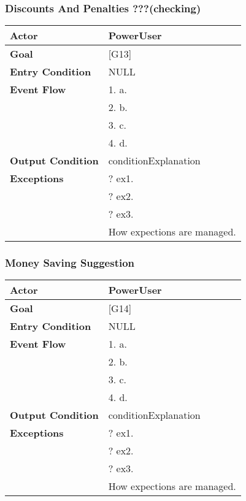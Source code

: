 \subsubsection{Discounts And Penalties ???(checking)}
\begin{tabular}{| l | p{8cm} |}
\hline
\textbf{Actor}      &       PowerUser \\
\hline
\textbf{Goal}       &       [G13]\\
\hline
\textbf{Entry Condition} &  NULL\\
\hline
\textbf{Event Flow}     &   1.	a.\\&
                                            2.	b.\\&
                                            3.	c.\\&
                                            4.  d.\\
\hline
\textbf{Output Condition} & conditionExplanation\\
\hline
\textbf{Exceptions} &       ?   ex1.\\& 
                            ?	ex2.\\&
                            ?	ex3.\\& 
                           How expections are managed.\\
\hline
\end{tabular} 


\subsubsection{Money Saving Suggestion}
\begin{tabular}{| l | p{8cm} |}
\hline
\textbf{Actor}      &       PowerUser \\
\hline
\textbf{Goal}       &       [G14]\\
\hline
\textbf{Entry Condition} &  NULL\\
\hline
\textbf{Event Flow}     &   1.	a.\\&
                                            2.	b.\\&
                                            3.	c.\\&
                                            4.  d.\\
\hline
\textbf{Output Condition} & conditionExplanation\\
\hline
\textbf{Exceptions} &       ?   ex1.\\& 
                            ?	ex2.\\&
                            ?	ex3.\\& 
                           How expections are managed.\\
\hline
\end{tabular} 


